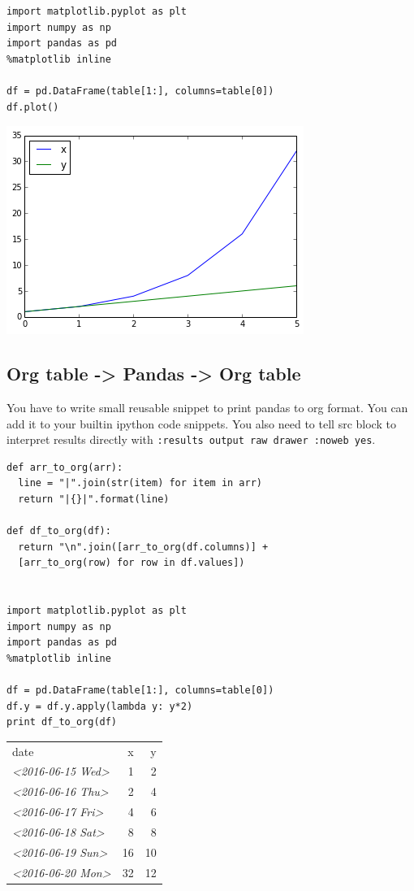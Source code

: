 \documentclass[11pt]{article}
\begin{document}
\begin{verbatim}
import matplotlib.pyplot as plt
import numpy as np
import pandas as pd
%matplotlib inline

df = pd.DataFrame(table[1:], columns=table[0])
df.plot()
\end{verbatim}

\includegraphics[width=.9\linewidth]{plot.png}
\subsection{Org table -> Pandas -> Org table}
\label{sec:orgheadline43}
You have to write small reusable snippet to print pandas to org format.
You can add it to your builtin ipython code snippets.
You also need to tell src block to interpret results directly with \texttt{:results output raw drawer :noweb yes}.

\begin{verbatim}
def arr_to_org(arr):
  line = "|".join(str(item) for item in arr)
  return "|{}|".format(line)

def df_to_org(df):
  return "\n".join([arr_to_org(df.columns)] +
  [arr_to_org(row) for row in df.values])


import matplotlib.pyplot as plt
import numpy as np
import pandas as pd
%matplotlib inline

df = pd.DataFrame(table[1:], columns=table[0])
df.y = df.y.apply(lambda y: y*2)
print df_to_org(df)
\end{verbatim}

\begin{center}
\begin{tabular}{lrr}
date & x & y\\
\textit{<2016-06-15 Wed>} & 1 & 2\\
\textit{<2016-06-16 Thu>} & 2 & 4\\
\textit{<2016-06-17 Fri>} & 4 & 6\\
\textit{<2016-06-18 Sat>} & 8 & 8\\
\textit{<2016-06-19 Sun>} & 16 & 10\\
\textit{<2016-06-20 Mon>} & 32 & 12\\
\end{tabular}
\end{center}
\end{document}
